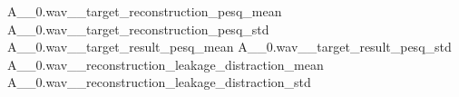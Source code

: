 \constrainingplot
{A__0.wav__target_reconstruction_pesq_mean}
{A__0.wav__target_reconstruction_pesq_std}
{A__0.wav__target_result_pesq_mean}
{A__0.wav__target_result_pesq_std}
{A__0.wav__reconstruction_leakage_distraction_mean}
{A__0.wav__reconstruction_leakage_distraction_std}

